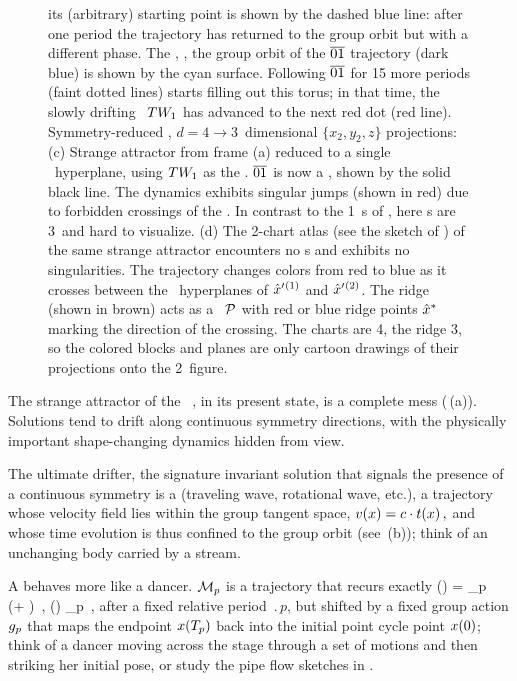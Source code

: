 \documentclass[aip,cha,reprint,
secnumarabic,
nofootinbib, tightenlines,
nobibnotes, showkeys, showpacs,
groupedaddress
]{revtex4-1}
\begin{document}
\begin{figure}
{  its (arbitrary) starting point is shown by the dashed blue line: after
  one period the trajectory has returned to the group orbit but with a
  different phase. The \wurst, \ie, the group orbit of the $\overline{01}$
  trajectory (dark blue) is shown by the cyan surface. Following
  $\overline{01}$ for 15 more periods (faint dotted lines) starts filling
  out this torus; in that time, the slowly drifting \reqv\ $TW_{1}$
  has advanced to the next red dot (red line).
Symmetry-reduced \cLf, $d=4 \to 3$~dimensional $\{x_2,y_2,z\}$ projections:
 (c)
 Strange attractor from frame (a) reduced to a single \slice\ hyperplane,
 using $TW_{1}$ as the \template. $\overline{01}$ is now a {\po}, shown
 by the solid black line. The dynamics exhibits singular jumps
 (shown in red) due to forbidden crossings of the \chartBord. In contrast
 to the 1\dmn\ \poincBord s of , here \chartBord s
 are 3\dmn\ and hard to visualize.
 (d)
The 2-chart atlas (see the sketch of ) of the same
strange attractor encounters no \chartBord s and exhibits no
singularities. The trajectory changes colors from red to blue as it
crosses between the \slice\ hyperplanes of ${\hat{x}'}{}^{(1)}$ and
${\hat{x}'}{}^{(2)}$. The ridge (shown in brown) acts as a \PoincSec\
${\cal P}$ with red or blue ridge points $\hat{x}^*$ marking the direction
of the crossing. The charts are 4\dmn, the ridge 3\dmn, so the colored
blocks and planes are only cartoon drawings of their projections onto the
2\dmn\ figure.
  }
\label{fig:CLf01group}
\end{figure}

The strange attractor of the \cLf\ , in its
present state, is a complete mess (\,(a)). Solutions tend to drift along
continuous symmetry directions, with the physically important
shape-changing dynamics hidden from view.

The ultimate drifter, the signature invariant solution that signals
the presence of a continuous symmetry is a {\em \reqv} (traveling wave,
rotational wave, etc.), a trajectory whose velocity field lies within the
group tangent space,
\(
v(x) = c \cdot t(x)
\,,
\) %
and whose time evolution is thus confined to the group orbit (see
\reffig{fig:CLf01group}\,(b)); think of an unchanging body carried by a
stream.

A {\em \rpo} behaves more like a dancer. ${\cal M}_p$ is a trajectory that
recurs exactly
\beq
\ssp(\zeit) = \LieEl_p \, \ssp(\zeit +  )
    \,,\qquad
\ssp(\zeit) \in \pS_p
    \,,
after a fixed {relative period} $\period{p}$, but shifted by a fixed
group action ${g_p}$ that maps the endpoint $x ({T_{p}}) $ back
into the initial point cycle point $x (0) $; think of a dancer moving
across the stage through a set of motions and then striking her initial
pose,\rf{ShWi06} or study the pipe flow sketches in .
\end{document}
